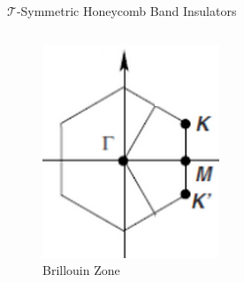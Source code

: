 \begin{frame}{$\mathcal{T}$-Symmetric Honeycomb Band Insulators}
\begin{columns}
\begin{column}[T]{0.35\textwidth}
{\begin{figure}
        \includegraphics[width=\linewidth]{diagrams/kpoint.png}
        \caption{Brillouin Zone}
    \end{figure}
}
\end{column}
\end{columns}
\end{frame}
